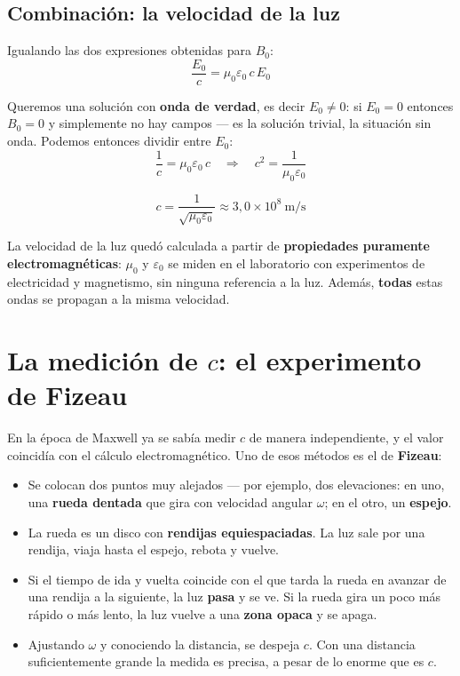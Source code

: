 \documentclass[12pt,a4paper]{article}
\begin{document}
\subsection{Combinación: la velocidad de la luz}

Igualando las dos expresiones obtenidas para $B_0$:
\[
\frac{E_0}{c} = \mu_0\varepsilon_0\,c\,E_0
\]

Queremos una solución con \textbf{onda de verdad}, es decir $E_0 \neq 0$: si
$E_0 = 0$ entonces $B_0 = 0$ y simplemente no hay campos --- es la solución
trivial, la situación sin onda. Podemos entonces dividir entre $E_0$:
\[
\frac{1}{c} = \mu_0\varepsilon_0\,c
\quad\Longrightarrow\quad
c^2 = \frac{1}{\mu_0\varepsilon_0}
\]

\begin{keybox}
\[
\boxed{\ c = \frac{1}{\sqrt{\mu_0\varepsilon_0}}
        \approx 3{,}0\times 10^{8}\ \si{\metre\per\second}\ }
\]
\end{keybox}

\begin{notebox}
La velocidad de la luz quedó calculada a partir de \textbf{propiedades
puramente electromagnéticas}: $\mu_0$ y $\varepsilon_0$ se miden en el
laboratorio con experimentos de electricidad y magnetismo, sin ninguna
referencia a la luz. Además, \textbf{todas} estas ondas se propagan a la
misma velocidad.
\end{notebox}

\section{La medición de $c$: el experimento de Fizeau}

En la época de Maxwell ya se sabía medir $c$ de manera independiente, y el
valor coincidía con el cálculo electromagnético. Uno de esos métodos es el de
\textbf{Fizeau}:

\begin{itemize}
  \item Se colocan dos puntos muy alejados --- por ejemplo, dos elevaciones:
        en uno, una \textbf{rueda dentada} que gira con velocidad angular
        $\omega$; en el otro, un \textbf{espejo}.
  \item La rueda es un disco con \textbf{rendijas equiespaciadas}. La luz
        sale por una rendija, viaja hasta el espejo, rebota y vuelve.
  \item Si el tiempo de ida y vuelta coincide con el que tarda la rueda en
        avanzar de una rendija a la siguiente, la luz \textbf{pasa} y se ve.
        Si la rueda gira un poco más rápido o más lento, la luz vuelve a una
        \textbf{zona opaca} y se apaga.
  \item Ajustando $\omega$ y conociendo la distancia, se despeja $c$. Con una
        distancia suficientemente grande la medida es precisa, a pesar de lo
        enorme que es $c$.
\end{itemize}
\end{document}
